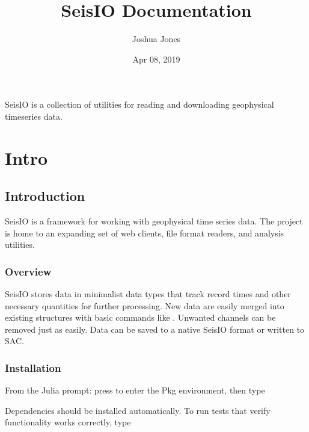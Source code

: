 \documentclass[letterpaper,11pt,english]{sphinxmanual}
\title{SeisIO Documentation}
\date{Apr 08, 2019}
\author{Joshua Jones}
\begin{document}
\pagestyle{empty}
\sphinxmaketitle
\pagestyle{plain}
\sphinxtableofcontents
\pagestyle{normal}
\label{\detokenize{index::doc}}


SeisIO is a collection of utilities for reading and downloading geophysical timeseries data.


\chapter{Intro}
\label{\detokenize{index:intro}}

\section{Introduction}
\label{\detokenize{src/intro:introduction}}\label{\detokenize{src/intro::doc}}
SeisIO is a framework for working with geophysical time series data. The project is home to an expanding set of web clients, file format readers, and analysis utilities.


\subsection{Overview}
\label{\detokenize{src/intro:overview}}
SeisIO stores data in minimalist data types that track record times and other necessary quantities for further processing. New data are easily merged into existing structures with basic commands like \sphinxcode{\sphinxupquote{+}}. Unwanted channels can be removed just as easily. Data can be saved to a native SeisIO format or written to SAC.


\subsection{Installation}
\label{\detokenize{src/intro:installation}}
From the Julia prompt: press \sphinxcode{\sphinxupquote{{]}}} to enter the Pkg environment, then type

\begin{sphinxVerbatim}[commandchars=\\\{\}]
   
\end{sphinxVerbatim}

Dependencies should be installed automatically. To run tests that verify functionality works correctly, type
\end{document}
